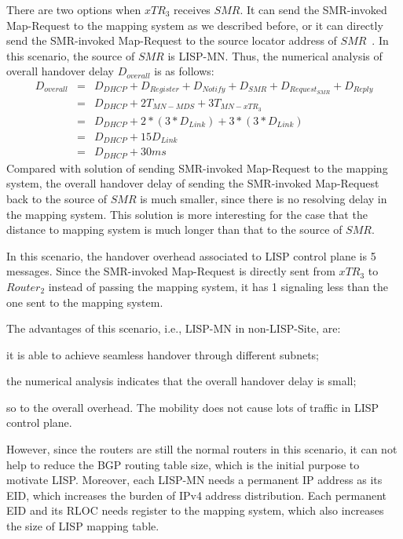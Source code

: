 There are two options when $xTR_3$ receives $SMR$. It can send the SMR-invoked Map-Request to the mapping system as we described before, or it can directly send the SMR-invoked Map-Request to the source locator address of $SMR$~\cite{rfc6830}. In this scenario, the source of $SMR$ is LISP-MN. Thus, the numerical analysis of overall handover delay $D_{overall}$ is as follows:
\begin{eqnarray}
D_{overall} &=& D_{DHCP} + D_{Register} + D_{Notify} + D_{SMR} + D_{Request_{SMR}} + D_{Reply} \nonumber \\
&=& D_{DHCP} + 2T_{MN-MDS} + 3T_{MN-xTR_3}  \nonumber \\
&=& D_{DHCP} + 2* (3*D_{Link}) + 3*(3*D_{Link}) \nonumber \\
&=& D_{DHCP} + 15D_{Link}  \\
&=& D_{DHCP} + 30 ms \nonumber
\end{eqnarray}
Compared with solution of sending SMR-invoked Map-Request to the mapping system, the overall handover delay of sending the SMR-invoked Map-Request back to the source of $SMR$ is much smaller, since there is no resolving delay in the mapping system. This solution is more interesting for the case that the distance to mapping system is much longer than that to the source of $SMR$.

In this scenario, the handover overhead associated to LISP control plane is 5 messages. Since the SMR-invoked Map-Request is directly sent from $xTR_3$ to $Router_2$ instead of passing the mapping system, it has 1 signaling less than the one sent to the mapping system.

The advantages of this scenario, i.e., LISP-MN in non-LISP-Site, are: 
\begin{inparaenum}[1)]
	\item it is able to achieve seamless handover through different subnets;
	\item the numerical analysis indicates that the overall handover delay is small;
	\item so to the overall overhead. The mobility does not cause lots of traffic in LISP control plane.
\end{inparaenum}
However, since the routers are still the normal routers in this scenario, it can not help to reduce the BGP routing table size, which is the initial purpose to motivate LISP. Moreover, each LISP-MN needs a permanent IP address as its EID, which increases the burden of IPv4 address distribution. Each permanent EID and its RLOC needs register to the mapping system, which also increases the size of LISP mapping table.


